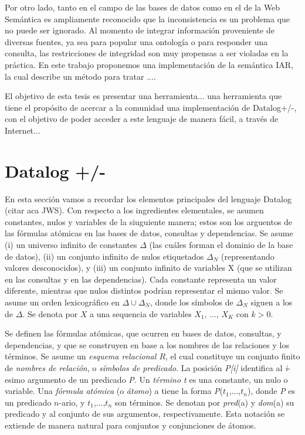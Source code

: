 \documentclass[11pt,a4paper,twoside]{tesis}
\begin{document}
Por otro lado, tanto en el campo de las bases de datos como en el de la Web Semántica es ampliamente reconocido que la inconsistencia es un problema que no puede ser ignorado. Al momento de integrar información proveniente de diversas fuentes, ya sea para popular una ontología o para responder una consulta, las restricciones de integridad son muy propensas a ser violadas en la práctica. En este trabajo proponemos una implementación de la semántica IAR, la cual describe un método para tratar ....

El objetivo de esta tesis es presentar una herramienta... una herramienta que tiene el propósito de acercar a la comunidad una implementación de Datalog+/-, con el objetivo de poder acceder a este lenguaje de manera fácil, a través de Internet...

\section{Datalog +/-}

En esta sección vamos a recordar los elementos principales del lenguaje Datalog (citar aca JWS).
Con respecto a los ingredientes elementales, se asumen constantes, nulos y variables de la siuguiente manera; estos son los arguentos de las fórmulas atómicas en las bases de datos, consultas y dependencias.
Se asume (i) un universo infinito de constantes  $\Delta$ (las cuáles forman el dominio de la base de  datos), (ii) un conjunto infinito de nulos etiquetados $\Delta_{N}$ (representando valores desconocidos), y (iii) un conjunto infinito de variables X (que se utilizan en las consultas y en las dependencias). Cada constante representa un valor diferente, mientras que nulos distintos podrían representar el mismo valor. 
Se asume un orden lexicográfico en  $\Delta \cup \Delta_{N}$, donde los símbolos de $\Delta_{N}$ siguen a los de $\Delta$. Se denota por $X$ a una sequencia de variables $X_{1}$, ..., $X_{K}$ con $k > 0$.

Se definen las fórmulas atómicas, que ocurren en bases de datos, consultas, y dependencias, y que se construyen en base a los nombres de las relaciones y los términos. Se asume un \textit{esquema relacional $R$}, el cual constituye un conjunto finito de \textit{nombres de relación}, o \textit{símbolos de predicado}. La posición \textit{P[i]} identifica al \textit{i}-esimo argumento de un predicado \textit{P}. Un \textit{término t} es una constante, un nulo o variable. Una \textit{fórmula atómica} (o \textit{átomo}) a tiene la forma \textit{P}($t_{1}$,...,$t_{n}$), donde \textit{P} es un predicado $n$-ario, y $t_{1}$,...,$t_{n}$ son términos. Se denotan por \textit{pred}(a) y \textit{dom}(a) su predicado y al conjunto de sus argumentos, respectivamente. Esta notación se extiende de manera natural para conjuntos y conjunciones de átomos. 
\end{document}
